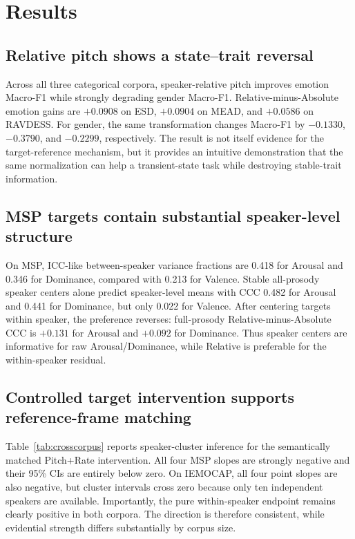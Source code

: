 \documentclass[11pt]{article}
\begin{document}
\section{Results}

\subsection{Relative pitch shows a state--trait reversal}

Across all three categorical corpora, speaker-relative pitch improves emotion Macro-F1 while strongly degrading gender Macro-F1.
Relative-minus-Absolute emotion gains are $+0.0908$ on ESD, $+0.0904$ on MEAD, and $+0.0586$ on RAVDESS.
For gender, the same transformation changes Macro-F1 by $-0.1330$, $-0.3790$, and $-0.2299$, respectively.
The result is not itself evidence for the target-reference mechanism, but it provides an intuitive demonstration that the same normalization can help a transient-state task while destroying stable-trait information.

\subsection{MSP targets contain substantial speaker-level structure}

On MSP, ICC-like between-speaker variance fractions are 0.418 for Arousal and 0.346 for Dominance, compared with 0.213 for Valence.
Stable all-prosody speaker centers alone predict speaker-level means with CCC 0.482 for Arousal and 0.441 for Dominance, but only 0.022 for Valence.
After centering targets within speaker, the preference reverses: full-prosody Relative-minus-Absolute CCC is $+0.131$ for Arousal and $+0.092$ for Dominance.
Thus speaker centers are informative for raw Arousal/Dominance, while Relative is preferable for the within-speaker residual.

\subsection{Controlled target intervention supports reference-frame matching}

Table~\ref{tab:crosscorpus} reports speaker-cluster inference for the semantically matched Pitch+Rate intervention.
All four MSP slopes are strongly negative and their 95\% CIs are entirely below zero.
On IEMOCAP, all four point slopes are also negative, but cluster intervals cross zero because only ten independent speakers are available.
Importantly, the pure within-speaker endpoint remains clearly positive in both corpora.
The direction is therefore consistent, while evidential strength differs substantially by corpus size.
\end{document}
